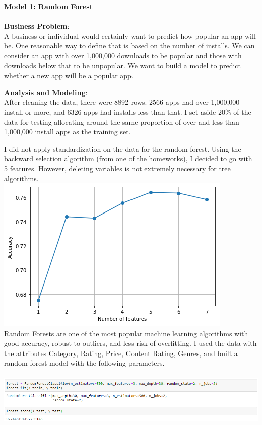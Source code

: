 \documentclass[11pt]{article}
\begin{document}
\underline{\textbf{Model 1: Random Forest}}\\ \\
\textbf{Business Problem}: \\
A business or individual would certainly want to predict how popular an app will be. One reasonable way to define that is based on the number of installs.  We can consider an app with over 1,000,000 downloads to be popular and those with downloads below that to be unpopular. We want to build a model to predict whether a new app will be a popular app.

\textbf{Analysis and Modeling}: \\
After cleaning the data, there were 8892 rows. 2566 apps had over 1,000,000 install or more, and 6326 apps had installs less than that. I set aside 20\% of the data for testing allocating around the same proportion of over and less than 1,000,000 install apps as the training set.

I did not apply standardization on the data for the random forest. Using the backward selection algorithm (from one of the homeworks), I decided to go with 5 features. However, deleting variables is not extremely necessary for tree algorithms.\\
\includegraphics[scale=0.5]{vip1} \\

Random Forests are one of the most popular machine learning algorithms with good accuracy, robust to outliers, and less risk of overfitting. I used the data with the attributes Category, Rating, Price, Content Rating, Genres, and built a random forest model with the following parameters. \\ \\
\includegraphics[scale=0.65]{model11} \\
\end{document}
